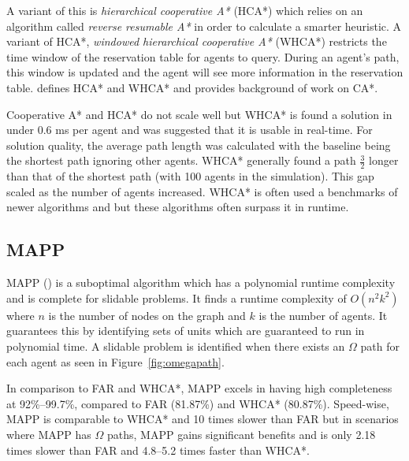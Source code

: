 \documentclass[a4paper,11pt]{article}
\begin{document}
A variant of this is \textit{hierarchical cooperative A*} (HCA*) which relies on an algorithm called \textit{reverse resumable A*} in order to calculate a smarter heuristic. A variant of HCA*, \textit{windowed hierarchical cooperative A*} (WHCA*) restricts the time window of the reservation table for agents to query. During an agent's path, this window is updated and the agent will see more information in the reservation table. \cite{silver2005cooperative} defines HCA* and WHCA* and provides background of work on CA*.

Cooperative A* and HCA* do not scale well but WHCA* is found a solution in under 0.6 ms per agent and was suggested that it is usable in real-time. For solution quality, the average path length was calculated with the baseline being the shortest path ignoring other agents. WHCA* generally found a path $\frac{3}{2}$ longer than that of the shortest path (with 100 agents in the simulation). This gap scaled as the number of agents increased. WHCA* is often used a benchmarks of newer algorithms and but these algorithms often surpass it in runtime.

\newpage \subsection{MAPP}
MAPP (\cite{wang2011mapp}) is a suboptimal algorithm which has a polynomial runtime complexity and is complete for slidable problems. It finds a runtime complexity of $O(n^2k^2)$ where $n$ is the number of nodes on the graph and $k$ is the number of agents. It guarantees this by identifying sets of units which are guaranteed to run in polynomial time. A slidable problem is identified when there exists an $\Omega$ path for each agent as seen in Figure~\ref{fig:omegapath}.



In comparison to FAR and WHCA*, MAPP excels in having high completeness at 92\%--99.7\%, compared to FAR (81.87\%) and WHCA* (80.87\%). Speed-wise, MAPP is comparable to WHCA* and 10 times slower than FAR  but in scenarios where MAPP has $\Omega$ paths, MAPP gains significant benefits and is only 2.18 times slower than FAR and 4.8--5.2 times faster than WHCA*.
\end{document}
